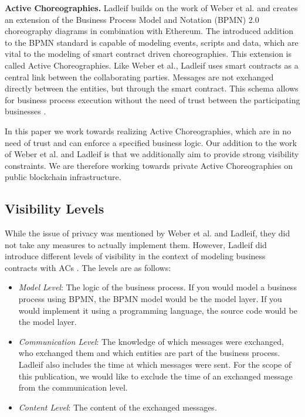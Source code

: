 \documentclass[runningheads]{llncs}
\newcommand{\ber}[1]{\textit{#1}}
\begin{document}
\textbf{Active Choreographies.} Ladleif builds on the work of Weber et al. and creates an extension of the Business Process Model and Notation (BPMN) 2.0 choreography diagrams in combination with Ethereum. The introduced addition to the BPMN standard is capable of modeling events, scripts and data, which are vital to the modeling of smart contract driven choreographies. This extension is called Active Choreographies. Like   Weber et al., Ladleif uses smart contracts as a central link between the collaborating parties. Messages are not exchanged directly between the entities, but through the smart contract. This schema allows for business process execution without the need of trust between the participating businesses \cite{ladleif}. 


In this paper we work towards realizing Active Choreographies, which are in no need of trust and can enforce a specified business logic. Our addition to the work of Weber et al. and Ladleif is that we additionally aim to provide strong visibility constraints. We are therefore working towards private Active Choreographies on public blockchain infrastructure. 




\subsection{Visibility Levels} \label{subsec:levels}

While the issue of privacy was mentioned by Weber et al. and Ladleif, they did not take any measures to actually implement them. However, Ladleif did introduce different levels of visibility in the context of modeling business contracts with ACs \cite{ladleif}. The levels are as follows:



\begin{itemize}
    \item \ber{Model Level}: The logic of the business process. If you would model a business process using BPMN, the BPMN model would be the model layer. If you would implement it using a programming language, the source code would be the model layer.
    \item \ber{Communication Level}: The knowledge of which messages were exchanged, who exchanged them and which entities are part of the business process. Ladleif also includes the time at which messages were sent. For the scope of this publication, we would like to exclude the time of an exchanged message from the communication level.
    \item \ber{Content Level}: The content of the exchanged messages.
\end{itemize}
\end{document}
